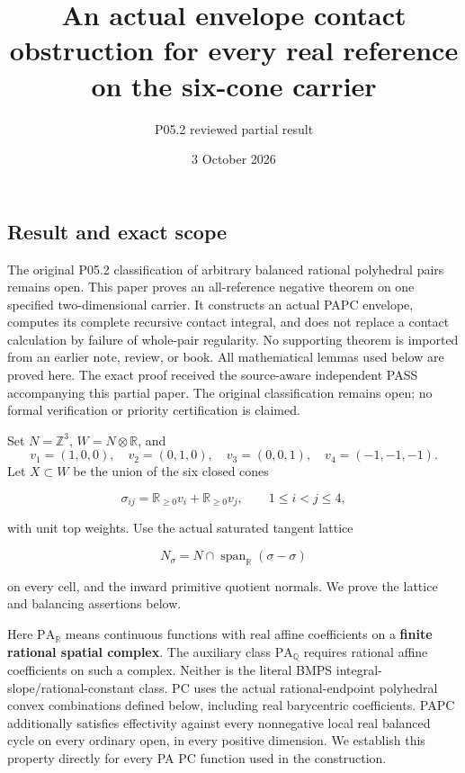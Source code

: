 \documentclass[
  10pt,
]{article}
\title{An actual envelope contact obstruction for every real reference
on the six-cone carrier}
\author{P05.2 reviewed partial result}
\date{3 October 2026}
\begin{document}
\maketitle

\subsection{Result and exact scope}\label{result-and-exact-scope}

The original P05.2 classification of arbitrary balanced rational
polyhedral pairs remains open. This paper proves an all-reference
negative theorem on one specified two-dimensional carrier. It constructs
an actual PAPC envelope, computes its complete recursive contact
integral, and does not replace a contact calculation by failure of
whole-pair regularity. No supporting theorem is imported from an earlier
note, review, or book. All mathematical lemmas used below are proved
here. The exact proof received the source-aware independent PASS
accompanying this partial paper. The original classification remains
open; no formal verification or priority certification is claimed.

Set \(N=\mathbb Z^3\), \(W=N\otimes\mathbb R\), and \[
v_1=(1,0,0),\quad v_2=(0,1,0),\quad v_3=(0,0,1),
\quad v_4=(-1,-1,-1).
\] Let \(X\subset W\) be the union of the six closed cones

\[
\sigma_{ij}=\mathbb R_{\geq0}v_i+\mathbb R_{\geq0}v_j,
\qquad 1\leq i<j\leq4,
\]

with unit top weights. Use the actual saturated tangent lattice

\[
N_\sigma=N\cap\operatorname{span}_{\mathbb R}(\sigma-\sigma)
\]

on every cell, and the inward primitive quotient normals. We prove the
lattice and balancing assertions below.

Here \(\mathrm{PA}_{\mathbb R}\) means continuous functions with real
affine coefficients on a \textbf{finite rational spatial complex}. The
auxiliary class \(\mathrm{PA}_{\mathbb Q}\) requires rational affine
coefficients on such a complex. Neither is the literal BMPS
integral-slope/rational-constant class. PC uses the actual
rational-endpoint polyhedral convex combinations defined below,
including real barycentric coefficients. PAPC additionally satisfies
effectivity against every nonnegative local real balanced cycle on every
ordinary open, in every positive dimension. We establish this property
directly for every PA PC function used in the construction.
\end{document}
